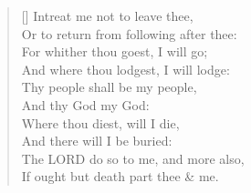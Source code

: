 \documentclass[MAIN]{subfiles}
\begin{document}
\settowidth{\versewidth}{Intreat me not to leave thee,}
\begin{verse}[\versewidth]
Intreat me not to leave thee,\\
\vin Or to return from following after thee:\\
For whither thou goest, I will go;\\
\vin And where thou lodgest, I will lodge:\\
Thy people shall be my people,\\
\vin And thy God my God:\\
Where thou diest, will I die,\\
\vin And there will I be buried:\\
The {\hge LORD} do so to me, and more also,\\
\vin If ought but death part thee \& me.
\end{verse}
\end{document}
